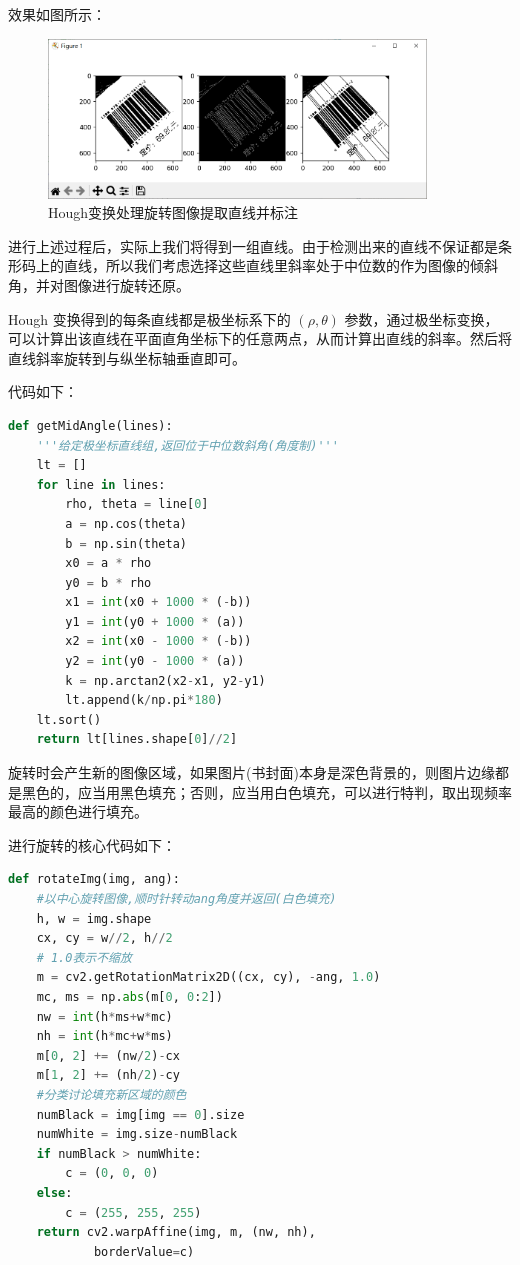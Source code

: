 \documentclass{ctexart}
\begin{document}
效果如图所示：

\begin{figure}[H]
    \centering
    \includegraphics[height=120pt]{hough}
    \caption{Hough变换处理旋转图像提取直线并标注}
\end{figure}

进行上述过程后，实际上我们将得到一组直线。由于检测出来的直线不保证都是条形码上的直线，所以我们考虑选择这些直线里斜率处于中位数的作为图像的倾斜角，并对图像进行旋转还原。

Hough 变换得到的每条直线都是极坐标系下的 $(\rho,\theta)$ 参数，通过极坐标变换，可以计算出该直线在平面直角坐标下的任意两点，从而计算出直线的斜率。然后将直线斜率旋转到与纵坐标轴垂直即可。

代码如下：
\begin{lstlisting}[language=python]
def getMidAngle(lines):
    '''给定极坐标直线组,返回位于中位数斜角(角度制)'''
    lt = []
    for line in lines:
        rho, theta = line[0]
        a = np.cos(theta)
        b = np.sin(theta)
        x0 = a * rho
        y0 = b * rho
        x1 = int(x0 + 1000 * (-b))
        y1 = int(y0 + 1000 * (a))
        x2 = int(x0 - 1000 * (-b))
        y2 = int(y0 - 1000 * (a))
        k = np.arctan2(x2-x1, y2-y1)
        lt.append(k/np.pi*180)
    lt.sort()
    return lt[lines.shape[0]//2]
\end{lstlisting}

旋转时会产生新的图像区域，如果图片(书封面)本身是深色背景的，则图片边缘都是黑色的，应当用黑色填充；否则，应当用白色填充，可以进行特判，取出现频率最高的颜色进行填充。

进行旋转的核心代码如下：
\begin{lstlisting}[language=python]
def rotateImg(img, ang):
    #以中心旋转图像,顺时针转动ang角度并返回(白色填充)
    h, w = img.shape
    cx, cy = w//2, h//2
    # 1.0表示不缩放
    m = cv2.getRotationMatrix2D((cx, cy), -ang, 1.0)
    mc, ms = np.abs(m[0, 0:2])
    nw = int(h*ms+w*mc)
    nh = int(h*mc+w*ms)
    m[0, 2] += (nw/2)-cx
    m[1, 2] += (nh/2)-cy
    #分类讨论填充新区域的颜色
    numBlack = img[img == 0].size
    numWhite = img.size-numBlack
    if numBlack > numWhite:
        c = (0, 0, 0)
    else:
        c = (255, 255, 255)
    return cv2.warpAffine(img, m, (nw, nh),
            borderValue=c)
\end{lstlisting}
\end{document}
